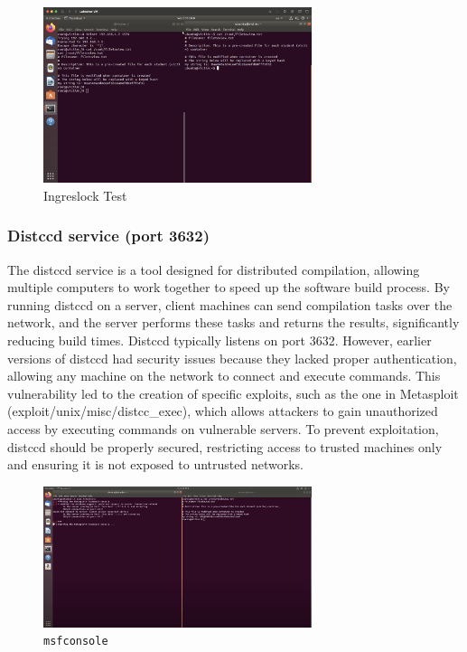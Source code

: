 \documentclass[a4paper,11pt]{article} %
\begin{document}
\begin{figure}[h!]
    \centering
    \includegraphics[width=0.7\textwidth]{images/06.png}
    \caption{Ingreslock Test}
\end{figure}

\subsubsection{Distccd service (port 3632)}
The distccd service is a tool designed for distributed compilation, allowing multiple computers to work together to speed up the software build process. By running distccd on a server, client machines can send compilation tasks over the network, and the server performs these tasks and returns the results, significantly reducing build times. Distccd typically listens on port 3632. However, earlier versions of distccd had security issues because they lacked proper authentication, allowing any machine on the network to connect and execute commands. This vulnerability led to the creation of specific exploits, such as the one in Metasploit (exploit/unix/misc/distcc\_exec), which allows attackers to gain unauthorized access by executing commands on vulnerable servers. To prevent exploitation, distccd should be properly secured, restricting access to trusted machines only and ensuring it is not exposed to untrusted networks.

\begin{figure}[h!]
    \centering
    \includegraphics[width=0.7\textwidth]{images/07.png}
    \caption{\texttt{msfconsole}}
\end{figure}
\end{document}
